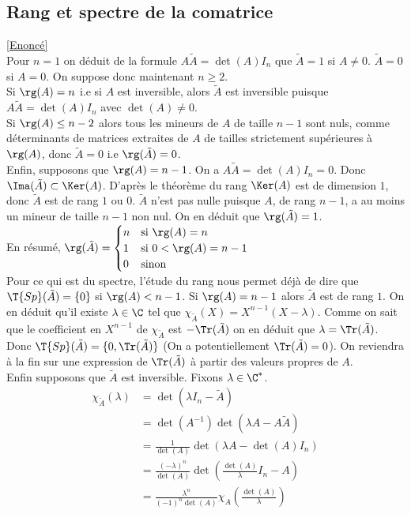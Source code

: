 \documentclass[8pt]{book}
\begin{document}
	\subsection{Rang et spectre de la comatrice }
	\label{Rang et spectre de la comatrice corrigé}
	\textcolor{blue}{\hyperref[Rang et spectre de la comatrice]{[Enoncé]}}\\
	Pour $n=1$ on déduit de la formule $A\tilde A=\det(A)I_n$ que $\tilde A=1$ si $A\ne 0$. $\tilde A=0$ si $A=0$. On suppose donc maintenant $n\geq 2$.\\
	Si $\rg(A)=n$ i.e si $A$ est inversible, alors $\tilde A$ est inversible puisque $A\tilde A=\det(A)I_n$ avec $\det(A)\ne 0$.\\
	Si $\rg(A)\leq n-2$ alors tous les mineurs de $A$ de taille $n-1$ sont nuls, comme déterminants de matrices extraites de $A$ de tailles strictement supérieures à $\rg(A)$, donc $\tilde A=0$ i.e $\rg(\tilde A)=0$.\\
	Enfin, supposons que $\rg(A)=n-1$. On a $A\tilde A=\det(A)I_n=0$. Donc $\Ima(\tilde A)\subset \Ker(A)$. D'après le théorème du rang $\Ker(A)$ est de dimension $1$, donc $\tilde A$ est de rang $1$ ou $0$. $\tilde A$ n'est pas nulle puisque $A$, de rang $n-1$, a au moins un mineur de taille $n-1$ non nul. On en déduit que $\rg(\tilde A)=1$.\\
	En résumé, $\rg(\tilde A)=\begin{cases}
		n&\mbox{si }\rg(A)=n\\
		1&\mbox{si }0<\rg(A)=n-1\\
		0&\mbox{sinon}
	\end{cases}$\\
	Pour ce qui est du spectre, l'étude du rang nous permet déjà de dire que $\T{Sp}(\tilde A)=\{0\}$ si $\rg(A)<n-1$. Si $\rg(A)=n-1$ alors $\tilde A$ est de rang $1$. On en déduit qu'il existe $\lambda\in \C$ tel que $\chi_{\tilde A}(X)=X^{n-1}(X-\lambda)$. Comme on sait que le coefficient en $X^{n-1}$ de $\chi_{\tilde A}$ est $-\Tr(\tilde A)$ on en déduit que $\lambda=\Tr(\tilde A)$. Donc $\T{Sp}(\tilde A)=\{0,\Tr(\tilde A)\}$ (On a potentiellement $\Tr(\tilde A)=0$). On reviendra à la fin sur une expression de $\Tr(\tilde A)$ à partir des valeurs propres de $A$.\\
	Enfin supposons que $\tilde A$ est inversible. Fixons $\lambda\in \C^*$.
	\begin{align*}
		\chi_{\tilde A}(\lambda)&=\det(\lambda I_n-\tilde A)\\
		&=\det(A^{-1})\det(\lambda A-A\tilde A)\\
		&=\frac{1}{\det(A)}\det(\lambda A-\det(A)I_n)\\
		&=\frac{(-\lambda)^n}{\det(A)}\det\left(\frac{\det(A)}{\lambda}I_n-A\right)\\
		&=\frac{\lambda^n}{(-1)^n\det(A)}\chi_A\left(\frac{\det(A)}{\lambda}\right)
	\end{align*}
\end{document}
